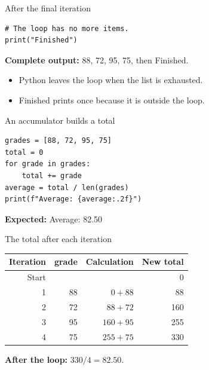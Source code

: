 \documentclass[aspectratio=169,12pt]{beamer}
\begin{document}
\begin{frame}[fragile]{After the final iteration}
\begin{lstlisting}
# The loop has no more items.
print("Finished")
\end{lstlisting}
\textbf{Complete output:} 88, 72, 95, 75, then Finished.
\begin{itemize}
\item Python leaves the loop when the list is exhausted.
\item Finished prints once because it is outside the loop.
\end{itemize}

\end{frame}
\begin{frame}[fragile]{An accumulator builds a total}
\begin{lstlisting}
grades = [88, 72, 95, 75]
total = 0
for grade in grades:
    total += grade
average = total / len(grades)
print(f"Average: {average:.2f}")
\end{lstlisting}
\textbf{Expected:} Average: 82.50

\end{frame}
\begin{frame}[fragile]{The total after each iteration}
\begin{center}
\renewcommand{\arraystretch}{1.3}
\begin{tabular}{rrrr}
Iteration & grade & Calculation & New total \\
\hline
Start & & & 0 \\
1 & 88 & $0 + 88$ & 88 \\
2 & 72 & $88 + 72$ & 160 \\
3 & 95 & $160 + 95$ & 255 \\
4 & 75 & $255 + 75$ & 330 \\
\end{tabular}
\end{center}
\textbf{After the loop:} $330 / 4 = 82.50$.

\end{frame}
\end{document}

